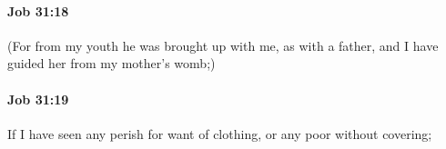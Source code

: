 		\paragraph{Job 31:18} %
			\label{JOB-31-18}

			(For from my youth he was brought up with me, as with a father, and I have guided her from my mother’s womb;)


		\paragraph{Job 31:19} %
			\label{JOB-31-19}

			If I have seen any perish for want of clothing, or any poor without covering;


